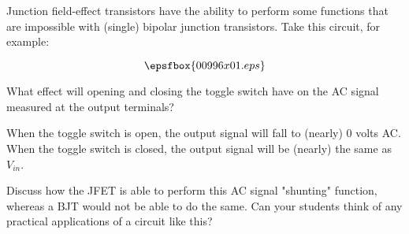 

Junction field-effect transistors have the ability to perform some functions that are impossible with (single) bipolar junction transistors.  Take this circuit, for example:

$$\epsfbox{00996x01.eps}$$

What effect will opening and closing the toggle switch have on the AC signal measured at the output terminals?







When the toggle switch is open, the output signal will fall to (nearly) 0 volts AC.  When the toggle switch is closed, the output signal will be (nearly) the same as $V_{in}$.







Discuss how the JFET is able to perform this AC signal "shunting" function, whereas a BJT would not be able to do the same.  Can your students think of any practical applications of a circuit like this?




